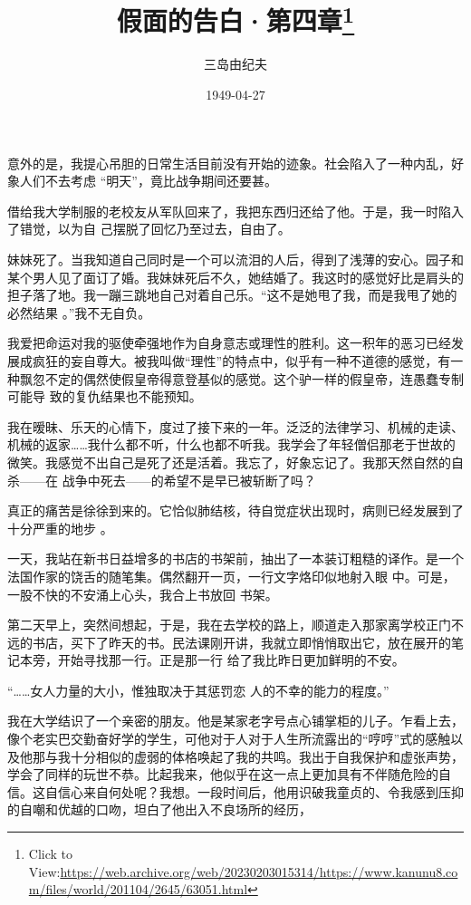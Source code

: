 \documentclass{article}
\title{假面的告白·第四章\footnote{Click to View:\url{https://web.archive.org/web/20230203015314/https://www.kanunu8.com/files/world/201104/2645/63051.html}}}
\author{三岛由纪夫}
\date{1949-04-27}
\begin{document}

\maketitle


\Large

意外的是，我提心吊胆的日常生活目前没有开始的迹象。社会陷入了一种内乱，好象人们不去考虑
“明天”，竟比战争期间还要甚。 

借给我大学制服的老校友从军队回来了，我把东西归还给了他。于是，我一时陷入了错觉，以为自
己摆脱了回忆乃至过去，自由了。 

妹妹死了。当我知道自己同时是一个可以流泪的人后，得到了浅薄的安心。园子和某个男人见了面订了婚。我妹妹死后不久，她结婚了。我这时的感觉好比是肩头的担子落了地。我一蹦三跳地自己对着自己乐。“这不是她甩了我，而是我甩了她的必然结果
。”我不无自负。 

\newpage

我爱把命运对我的驱使牵强地作为自身意志或理性的胜利。这一积年的恶习已经发展成疯狂的妄自尊大。被我叫做“理性”的特点中，似乎有一种不道德的感觉，有一种飘忽不定的偶然使假皇帝得意登基似的感觉。这个驴一样的假皇帝，连愚蠢专制可能导
致的复仇结果也不能预知。 

我在暧昧、乐天的心情下，度过了接下来的一年。泛泛的法律学习、机械的走读、机械的返家……我什么都不听，什么也都不听我。我学会了年轻僧侣那老于世故的微笑。我感觉不出自己是死了还是活着。我忘了，好象忘记了。我那天然自然的自杀——在
战争中死去——的希望不是早已被斩断了吗？ 

真正的痛苦是徐徐到来的。它恰似肺结核，待自觉症状出现时，病则已经发展到了十分严重的地步
。 

一天，我站在新书日益增多的书店的书架前，抽出了一本装订粗糙的译作。是一个法国作家的饶舌的随笔集。偶然翻开一页，一行文字烙印似地射入眼
\newpage
中。可是，一股不快的不安涌上心头，我合上书放回
书架。 

第二天早上，突然间想起，于是，我在去学校的路上，顺道走入那家离学校正门不远的书店，买下了昨天的书。民法课刚开讲，我就立即悄悄取出它，放在展开的笔记本旁，开始寻找那一行。正是那一行
给了我比昨日更加鲜明的不安。 

“……女人力量的大小，惟独取决于其惩罚恋
人的不幸的能力的程度。” 

我在大学结识了一个亲密的朋友。他是某家老字号点心铺掌柜的儿子。乍看上去，像个老实巴交勤奋好学的学生，可他对于人对于人生所流露出的“哼哼”式的感触以及他那与我十分相似的虚弱的体格唤起了我的共鸣。我出于自我保护和虚张声势，学会了同样的玩世不恭。比起我来，他似乎在这一点上更加具有不伴随危险的自信。这自信心来自何处呢？我想。一段时间后，他用识破我童贞的、令我感到压抑的自嘲和优越的口吻，坦白了他出入不良场所的经历，
\newpage
\end{document}
